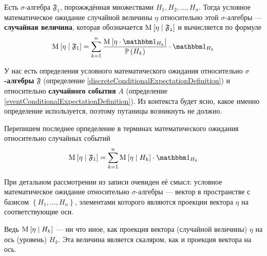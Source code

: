 \begin{definition}
  \label{def:SA:finiteSA}
  \label{discreteConditionalExpectationDefinition}
  Есть $\sigma$-алгебра $\mathfrak{F}_1$,
  порожждённая множествами $H_1, H_2, \dots, H_n$.
  Тогда условное математическое ожидание случайной величины
  $\eta$ относительно этой $\sigma$-алгебры --- \textbf{случайная величина},
  которая обозначается $\operatorname{M}_{} \left[  \eta \;\middle|\; \mathfrak{F_1}  \right]$
  и вычисляется по формуле
  $$\Mean{ \eta \mcond \mathfrak{F}_1 }
      = \sum_{k=1}^n
      \frac{\Mean{ \eta \cdot \indicatorof{H_k} }}
      {\probability{H_k}}
      \cdot \indicatorof{H_k}$$
\end{definition}

\begin{remark}
  У нас есть определения условного математического ожидания
  относительно \textbf{$\sigma$-алгебры} $\mathfrak{F}$ (определение
  \ref{discreteConditionalExpectationDefinition})
  и относительно \textbf{случайного события} $A$ (определение 
  \ref{eventConditionalExpectationDefinition}).
  Из контекста будет ясно, какое именно определение используется,
  поэтому путаницы возникнуть не должно.

  Перепишем последнее орпеделение в терминах математического
  ожидания относительно случайных событий
  \begin{equation*}
    \Mean{ \eta \mcond \mathfrak{F}_1 }
    = \sum_{k=1}^n \Mean{ \eta \mcond H_k }
      \cdot \indicatorof{H_k}
  \end{equation*}

  При детальном рассмотрении из записи очевиден её смысл:
  условное математическое ожидание относительно $\sigma$-алгебры --- вектор
  в пространстве с базисом $\left\{ H_1, \dots, H_n \right\}$, элементами
  которого являются проекции вектора $\eta$ на соответствующие оси.
  
  Ведь $\operatorname{M}_{} \left[  \eta \;\middle|\; H_k  \right]$ --- ни что иное, как проекция
  вектора (случайной величины) $\eta$ на ось (уровень) $H_k$.
  Эта величина является скаляром, как и проекция вектора на ось.
\end{remark}

